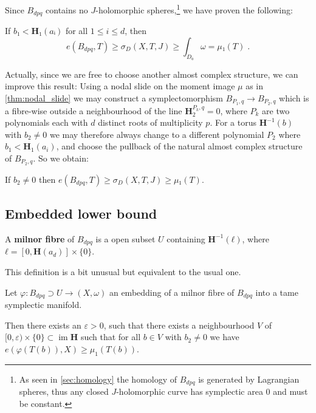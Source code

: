 \documentclass[12pt,a4paper,draft]{scrartcl}
\DeclareMathOperator{\im}{im}
\begin{document}
Since $B_{dpq}$ contains no $J$-holomorphic spheres,\footnote{As seen in \cref{sec:homology} the homology of $B_{dpq}$ is generated by Lagrangian spheres, thus any closed $J$-holomorphic curve has symplectic area $0$ and must be constant.} we have proven the following:

\begin{lemma}
  \label{thm:lower_bound_tmp}
  If $b₁ < \symbf{H}₁(aᵢ)$ for all $1 ≤ i ≤ d$, then
  \[e(B_{dpq},T) ≥ σ_D(X,T,J) ≥ ∫_{D₀} ω  = μ₁(T) \; .\]
\end{lemma}

Actually, since we are free to choose another almost complex structure, we can improve this result: 
Using a nodal slide on the moment image $μ$ as in \cref{thm:nodal_slide} we may construct a symplectomorphism $B_{P_1,q} → B_{P_2,q}$ which is a fibre-wise outside a neighbourhood of the line $\symbf{H}^{P_k,q}_2=0$, where $P_k$ are two polynomials each with $d$ distinct roots of multiplicity $p$.
For a torus $\symbf{H}^{-1}(b)$ with $b_2 ≠ 0$ we may therefore always change to a different polynomial $P_2$ where $b_1 < \symbf{H}_1(a_i)$, and choose the pullback of the natural almost complex structure of $B_{P_2,q}$. So we obtain:

\begin{lemma}
  \label{thm:lower_bound_old}
  If $b_2 ≠ 0$ then $e(B_{dpq},T) ≥ σ_D(X,T,J) ≥ μ₁(T)$.
\end{lemma}

\subsection{Embedded lower bound}



\begin{definition}
A \textbf{milnor fibre}
of $B_{dpq}$ is a open subset $U$ containing $\symbf{H}^{-1}(ℓ)$, where $ℓ = [0,\symbf{H}(a_d)] × \{0\}$. \end{definition}

\begin{remark}
  This definition is a bit unusual but equivalent to the usual one.
\end{remark}

\begin{proposition}
  \label{thm:lower_bound_embedded}
  Let $φ:B_{dpq} ⊃ U → (X,ω)$ an embedding of a milnor fibre of $B_{dpq}$ into a tame symplectic manifold.

  Then there exists an $ε>0$, such that there exists a neighbourhood $V$ of $[0,ε) × \{0\} ⊂ \im{\symbf{H}}$ such that for all $b ∈ V$ with $b_2 ≠ 0$ we have $e(φ(T(b)),X) ≥ μ_1(T(b))$.
\end{proposition}
\end{document}
